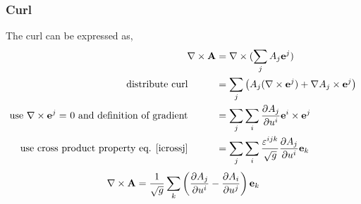 \subsubsection{Curl}
The curl can be expressed as,
\begin{align}
    \nabla \times \mathbf{A} &= \nabla \times (\sum_j A_j\mathbf{e}^j) \\
    \text{distribute curl} \hspace{1cm}&= \sum_j \left(A_j (\nabla \times \mathbf{e}^j) + \nabla A_j \times \mathbf{e}^j\right) \\
    \text{use $\nabla \times \mathbf{e}^j = $ 0 and definition of gradient} \hspace{1cm}&= \sum_j\sum_i \frac{\partial A_j}{\partial u^i} \mathbf{e}^i \times \mathbf{e}^j  \\
    \text{use cross product property eq. \ref{icrossj}} \hspace{1cm}&= \sum_j\sum_i \frac{\varepsilon^{ijk}}{\sqrt{g}} \frac{\partial A_j}{\partial u^i} \mathbf{e}_k
\end{align}
\begin{equation}
    \nabla \times \mathbf{A} = \frac{1}{\sqrt{g}} \sum_{k} \left( \frac{\partial A_j}{\partial u^i}  - \frac{\partial A_i}{\partial u^j}\right) \mathbf{e}_k   \label{cl-curl}
\end{equation}


